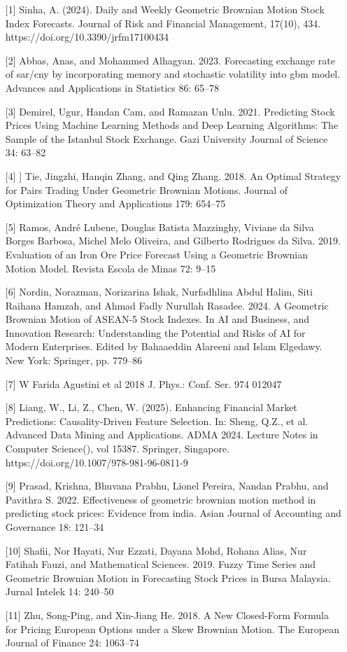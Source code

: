 \begin{talk}
\begin{enumerate}
	\item[{[1]}] Sinha, A. (2024). Daily and Weekly Geometric Brownian Motion Stock Index Forecasts. Journal of Risk and Financial Management, 17(10), 434. https://doi.org/10.3390/jrfm17100434
	\item[{[2]}] Abbas, Anas, and Mohammed Alhagyan. 2023. Forecasting exchange rate of sar/cny by incorporating memory and stochastic volatility into gbm model. Advances and Applications in Statistics 86: 65–78
    \item[{[3]}] Demirel, Ugur, Handan Cam, and Ramazan Unlu. 2021. Predicting Stock Prices Using Machine Learning Methods and Deep Learning Algorithms: The Sample of the Istanbul Stock Exchange. Gazi University Journal of Science 34: 63–82
    \item[{[4]}]] Tie, Jingzhi, Hanqin Zhang, and Qing Zhang. 2018. An Optimal Strategy for Pairs Trading Under Geometric Brownian Motions. Journal of Optimization Theory and Applications 179: 654–75
    \item[{[5]}] Ramos, André Lubene, Douglas Batista Mazzinghy, Viviane da Silva Borges Barbosa, Michel Melo Oliveira, and Gilberto Rodrigues da Silva. 2019. Evaluation of an Iron Ore Price Forecast Using a Geometric Brownian Motion Model. Revista Escola de Minas 72: 9–15
    \item[{[6]}] Nordin, Norazman, Norizarina Ishak, Nurfadhlina Abdul Halim, Siti Raihana Hamzah, and Ahmad Fadly Nurullah Rasadee. 2024. A Geometric Brownian Motion of ASEAN-5 Stock Indexes. In AI and Business, and Innovation Research: Understanding the Potential and Risks of AI for Modern Enterprises. Edited by Bahaaeddin Alareeni and Islam Elgedawy. New York: Springer, pp. 779–86
    \item[{[7]}]W Farida Agustini et al 2018 J. Phys.: Conf. Ser. 974 012047
    \item[{[8]}] Liang, W., Li, Z., Chen, W. (2025). Enhancing Financial Market Predictions: Causality-Driven Feature Selection. In: Sheng, Q.Z., et al. Advanced Data Mining and Applications. ADMA 2024. Lecture Notes in Computer Science(), vol 15387. Springer, Singapore. https://doi.org/10.1007/978-981-96-0811-9
    \item[{[9]}] Prasad, Krishna, Bhuvana Prabhu, Lionel Pereira, Nandan Prabhu, and Pavithra S. 2022. Effectiveness of geometric brownian motion method in predicting stock prices: Evidence from india. Asian Journal of Accounting and Governance 18: 121–34
    \item[{[10]}] Shafii, Nor Hayati, Nur Ezzati, Dayana Mohd, Rohana Alias, Nur Fatihah Fauzi, and Mathematical Sciences. 2019. Fuzzy Time Series and Geometric Brownian Motion in Forecasting Stock Prices in Bursa Malaysia. Jurnal Intelek 14: 240–50
    \item[{[11]}] Zhu, Song-Ping, and Xin-Jiang He. 2018. A New Closed-Form Formula for Pricing European Options under a Skew Brownian Motion. The European Journal of Finance 24: 1063–74
\end{enumerate}

\end{talk}

